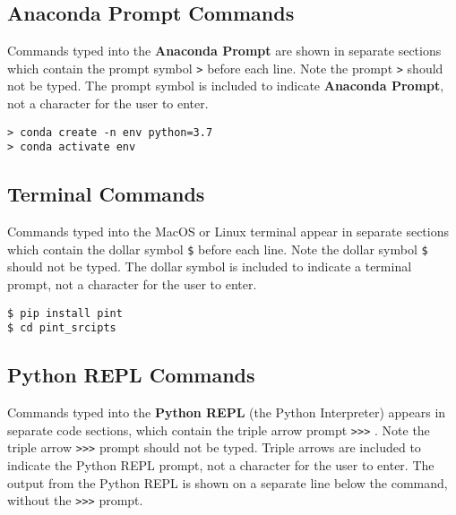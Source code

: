 \documentclass{book}
\newcommand{\passthrough}[1]{#1}
\begin{document}
    
        \hypertarget{anaconda-prompt-commands}{%
\subsection{Anaconda Prompt Commands}\label{anaconda-prompt-commands}}

Commands typed into the \textbf{Anaconda Prompt} are shown in separate
sections which contain the prompt symbol \passthrough{\lstinline!>!}
before each line. Note the prompt \passthrough{\lstinline!>!} should not
be typed. The prompt symbol is included to indicate \textbf{Anaconda
Prompt}, not a character for the user to enter.

\begin{lstlisting}
> conda create -n env python=3.7
> conda activate env
\end{lstlisting}
    




    
        \hypertarget{terminal-commands}{%
\subsection{Terminal Commands}\label{terminal-commands}}

Commands typed into the MacOS or Linux terminal appear in separate
sections which contain the dollar symbol \passthrough{\lstinline!$!}
before each line. Note the dollar symbol \passthrough{\lstinline!$!}
should not be typed. The dollar symbol is included to indicate a
terminal prompt, not a character for the user to enter.

\begin{lstlisting}
$ pip install pint
$ cd pint_srcipts
\end{lstlisting}
    




    
        \hypertarget{python-repl-commands}{%
\subsection{Python REPL Commands}\label{python-repl-commands}}

Commands typed into the \textbf{Python REPL} (the Python Interpreter)
appears in separate code sections, which contain the triple arrow prompt
\passthrough{\lstinline!>>>!} . Note the triple arrow
\passthrough{\lstinline!>>>!} prompt should not be typed. Triple arrows
are included to indicate the Python REPL prompt, not a character for the
user to enter. The output from the Python REPL is shown on a separate
line below the command, without the \passthrough{\lstinline!>>>!}
prompt.
\end{document}

